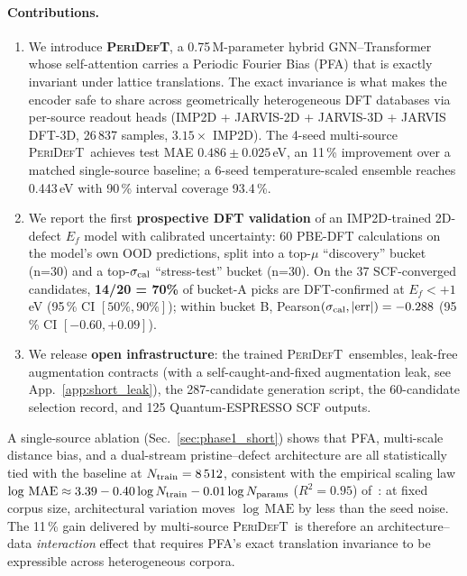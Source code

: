 \documentclass[11pt,a4paper]{article}
\newcommand{\modelname}{\textsc{PeriDefT}}
\begin{document}
\paragraph{Contributions.}
\begin{enumerate}
\item We introduce \textbf{\modelname}, a 0.75\,M-parameter hybrid
GNN--Transformer whose self-attention carries a Periodic Fourier
Bias (PFA) that is exactly invariant under lattice translations. The
exact invariance is what makes the encoder safe to share across
geometrically heterogeneous DFT databases via per-source readout
heads (IMP2D + JARVIS-2D + JARVIS-3D + JARVIS DFT-3D, 26\,837 samples,
$3.15\times$ IMP2D). The 4-seed multi-source \modelname\ achieves
test MAE $0.486\pm0.025$\,eV, an 11\,\% improvement over a matched
single-source baseline; a 6-seed temperature-scaled ensemble reaches
0.443\,eV with 90\,\% interval coverage 93.4\,\%.

\item We report the first \textbf{prospective DFT validation} of
an IMP2D-trained 2D-defect $E_f$ model with calibrated uncertainty:
60 PBE-DFT calculations on the model's own OOD predictions, split
into a top-$\mu$ ``discovery'' bucket (n=30) and a top-$\sigma_{\rm
cal}$ ``stress-test'' bucket (n=30). On the 37 SCF-converged
candidates, \textbf{14/20 = 70\%} of bucket-A picks are DFT-confirmed
at $E_f<+1$\,eV (95\,\% CI $[50\%,90\%]$); within bucket B,
Pearson$(\sigma_{\rm cal}, |\mathrm{err}|) = -0.288$
(95\,\% CI $[-0.60, +0.09]$).

\item We release \textbf{open infrastructure}: the trained
\modelname\ ensembles, leak-free augmentation contracts (with a
self-caught-and-fixed augmentation leak, see App.~\ref{app:short_leak}),
the 287-candidate generation script, the 60-candidate selection
record, and 125 Quantum-ESPRESSO SCF outputs.
\end{enumerate}

A single-source ablation (Sec.~\ref{sec:phase1_short}) shows that
PFA, multi-scale distance bias, and a dual-stream pristine--defect
architecture are all statistically tied with the baseline at
$N_{\rm train}=8\,512$, consistent with the empirical scaling law
$\log\,\mathrm{MAE} \approx 3.39 - 0.40\log N_{\rm train} -
0.01\log N_{\rm params}$ ($R^2=0.95$) of~\cite{ourPaperV12}: at
fixed corpus size, architectural variation moves $\log\,\mathrm{MAE}$
by less than the seed noise. The 11\,\% gain delivered by
multi-source \modelname\ is therefore an architecture--data
\emph{interaction} effect that requires PFA's exact translation
invariance to be expressible across heterogeneous corpora.
\end{document}
